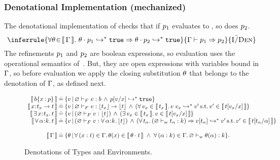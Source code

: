 \subsubsection{Denotational Implementation (mechanized)}
\label{sec:typing:implication:denotational}
The denotational implementation of 
checks that if $p_1$ evaluates to \ttrue, so does $p_2$. 
%
$$
  \inferrule
  { \forall \clsub\!\in\!\denote{\tcenv}. \
      \evalsTo{\applysubst{\clsub}{\spred_1}}{\ttrue}
      \Rightarrow 
      \evalsTo{\applysubst{\clsub}{\spred_2}}{\ttrue}
  }
  {\imply{\tcenv}{\spred_1}{\spred_2}}
  {\iDen}
$$
The refinements $p_1$ and $p_2$ are boolean expressions, 
so evaluation uses the operational semantics of~\Cref{fig:opsem}. 
But, they are open expressions with variables bound in $\mathrm{\Gamma}$,
so before evaluation we apply the closing substitution $\theta$
that belongs to the denotation of $\mathrm{\Gamma}$, as defined next. 

\begin{figure}
$$\begin{array}{r@{\hskip 0.03in}c@{\hskip 0.03in}l}
\denote{\breft{\sbase}{x}{p}} & \defeq &
  \setcomp{\sval}{\hasftype{\varnothing}{\sval}{\sbase} \,\wedge\, \evalsTo{\subst{p}{x}{\sval}}{\ttrue}} \\
\denote{\functype{x}{\stype_x}{\stype}} & \defeq &
  \setcomp{\sval}{\hasftype{\varnothing}{\sval}{\funcftype{\forgetreft{\stype_x}}{\forgetreft{\stype}}} \,\wedge\, (\forall\, \sval_x \in \denote{\stype_x}.\, \evalsTo{\app{\sval}{\sval_x}}{\sval'} \,{\rm s.t.}\, \sval' \in \denote{\subst{\stype}{x}{\sval_x}} }  \\
\denote{\existype{x}{\stype_x}{\stype}} & \defeq &
  \setcomp{\sval}{(\hasftype{\varnothing}{\sval}{\forgetreft{\stype}}) \,\wedge\,
    ( \exists\, \sval_x \in \denote{\stype_x}.\, \sval\in \denote{\subst{\stype}{x}{\sval_x}} }   \\
\denote{\polytype{\al}{\skind}{\stype}} & \defeq &
  \setcomp{\sval}{(\hasftype{\varnothing}{\sval}{\polytype{\al}{\skind}{\forgetreft{\stype}}}) \,\wedge\,
    (\forall\, \stype_\al.\, (\isWellFormed{\varnothing}{\stype_\al}{\skind}) \Rightarrow
    \evalsTo{\tyapp{\sval}{\stype_\al}}{\sval'}
    \,{\rm s.t.}\, \sval' \in \denote{\subst{\stype}{\al}{\stype_\al}}} \\ \\ 
\denote{\tcenv} & \defeq &
\setcomp{\clsub} %
{\forall\, (x:t) \in \tcenv.\, \clsub(x) \in \denote{\applysubst{\clsub}{t}} \;\wedge\;
\forall\, (\al:k) \in \tcenv.\, \isWellFormed{\varnothing}{\clsub(\al)}{k}}.
\end{array}$$
\vspace{-0.2cm}
\caption{Denotations of Types and Environments.}
\label{fig:den}
\vspace{-0.4cm}
\end{figure}

